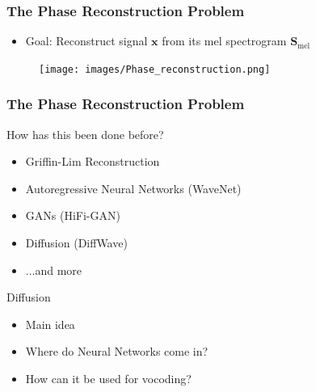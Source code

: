\documentclass{beamer}
\begin{document}

\begin{frame}
    \frametitle{The Phase Reconstruction Problem}

    \begin{itemize}
        \item Goal: Reconstruct signal $\bm{x}$ from its mel spectrogram $\bm{S}_{\text{mel}}$
    \end{itemize}
    
    \pause

    \begin{figure}[H]
        \centering
        \texttt{[image: images/Phase\_reconstruction.png]}
    \end{figure}
    
\end{frame}


\begin{frame}
    \frametitle{The Phase Reconstruction Problem}

    How has this been done before?

    \vspace{1cm}

    \begin{itemize}
        \pause
        \item Griffin-Lim Reconstruction
        \pause
        \item Autoregressive Neural Networks (WaveNet)
        \pause
        \item GANs (HiFi-GAN)
        \pause
        \item Diffusion (DiffWave)
        \pause
        \item ...and more
    \end{itemize}
    
    
\end{frame}


\begin{frame}{Diffusion}
\large
    \begin{itemize}
        \setlength\itemsep{1.5em}
        \item Main idea 
        \item Where do Neural Networks come in? 
        \item How can it be used for vocoding?
    \end{itemize}

\end{frame}    
\end{document}
